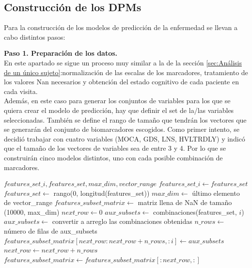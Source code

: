 \subsection{Construcción de los DPMs}
Para la construcción de los modelos de predicción de la enfermedad se llevan a cabo distintos pasos:

\begin{description}
	\item {\textbf{Paso 1. Preparación de los datos.}}\\
	En este apartado se sigue un proceso muy similar a la  de la sección \ref{sec:Análisis de un único sujeto}:normalización de las escalas de los marcadores, tratamiento de los valores Nan necesarios y obtención del estado cognitivo de cada paciente en cada visita.\\
	
	Además, en este caso para generar los conjuntos de variables para los que se quiera crear el modelo de predicción, hay que definir el set de la/las variables seleccionadas. También se define el rango de tamaño que tendrán los vectores que se generarán del conjunto de biomarcadores escogidos. Como primer intento, se decidió trabajar con cuatro variables (MOCA, GDS, LNS, HVLTRDLY) y indicó que el tamaño de los vectores de variables sea de entre 3 y 4. Por lo que se construirán cinco modelos distintos, uno con cada posible combinación de marcadores. \\
	
	\begin{algorithm}
		\caption{Generación de conjuntos de marcadores}
		\begin{algorithmic}[1]
			\REQUIRE $features\_set\_i, features\_set, max\_dim, vector\_range$
			\STATE $features\_set\_i \gets features\_set$
			\STATE $features\_set \gets$ rango(0, longitud(features\_set))
			\STATE $max\_dim \gets$ último elemento de vector\_range
			\STATE $features\_subset\_matrix \gets$ matriz llena de NaN de tamaño (10000, max\_dim)
			\STATE $next\_row \gets 0$
			\STATE $aux\_subsets \gets$ combinaciones(features\_set, $i$)
			\STATE $aux\_subsets \gets$ convertir a arreglo las combinaciones obtenidas
			\STATE $n\_rows \gets$ número de filas de aux\_subsets
			\STATE $features\_subset\_matrix[next\_row:next\_row+n\_rows, :i] \gets aux\_subsets$
			\STATE $next\_row \gets next\_row + n\_rows$
			\ENDFOR
			\STATE $features\_subset\_matrix \gets features\_subset\_matrix[:next\_row, :]$
		\end{algorithmic}
	\end{algorithm}
	

\end{description}
